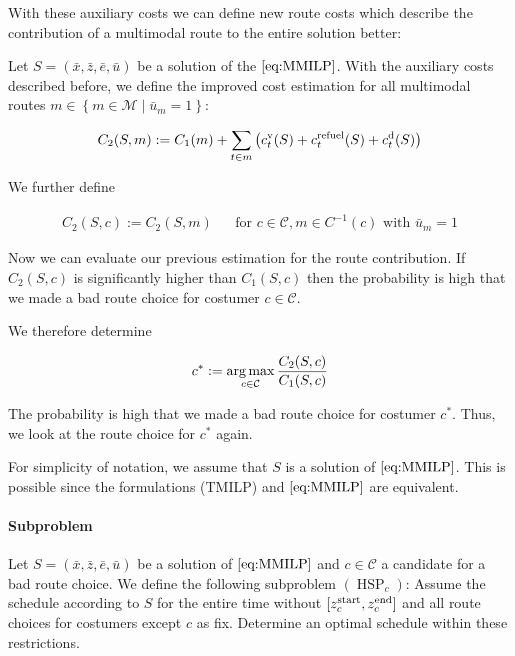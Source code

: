 With these auxiliary costs we can define new route costs which describe the contribution of a multimodal route to the entire solution better:

\begin{definition}

Let $S=\left(\bar{x},\bar{z},\bar{e},\bar{u}\right)$ be a solution of the $\eqref{eq:MMILP}$. With the auxiliary costs described before, we define the improved cost estimation for all multimodal routes $m\in\left\{m\in\mathcal{M}\mid \bar{u}_m=1\right\}$:

\begin{align*}
	C_2(S,m) := C_1(m) + \sum_{t\in m}\left(c^{\operatorname{v}}_t(S) + c^{\operatorname{refuel}}_t(S) + c^{\operatorname{d}}_t(S)\right)
\end{align*}

We further define

\begin{align*}
	C_2(S,c) := C_2(S,m) && \text{for } c\in\mathcal{C},m\in C^{-1}(c) \text{ with } \bar{u}_m = 1
\end{align*}

\end{definition}

Now we can evaluate our previous estimation for the route contribution. If $C_2(S,c)$ is significantly higher than $C_1(S,c)$ then the probability is high that we made a bad route choice for costumer $c\in\mathcal{C}$.

We therefore determine

\begin{align*}
	c^* := \operatorname*{arg\,max}_{c\in\mathcal{C}} \frac{C_2(S,c)}{C_1(S,c)}
\end{align*}

The probability is high that we made a bad route choice for costumer $c^*$. Thus, we look at the route choice for $c^*$ again.

\begin{remark}

For simplicity of notation, we assume that $S$ is a solution of $\eqref{eq:MMILP}$. This is possible since the formulations (TMILP) and $\eqref{eq:MMILP}$ are equivalent.

\end{remark}

\paragraph{Subproblem} \parfill

Let $S=\left(\bar{x},\bar{z},\bar{e},\bar{u}\right)$ be a solution of $\eqref{eq:MMILP}$ and $c\in\mathcal{C}$ a candidate for a bad route choice. We define the following subproblem $(\operatorname{HSP}_c)$: Assume the schedule according to $S$ for the entire time without $[z^{\operatorname{start}}_c,z^{\operatorname{end}}_c]$ and all route choices for costumers except $c$ as fix. Determine an optimal schedule within these restrictions.

